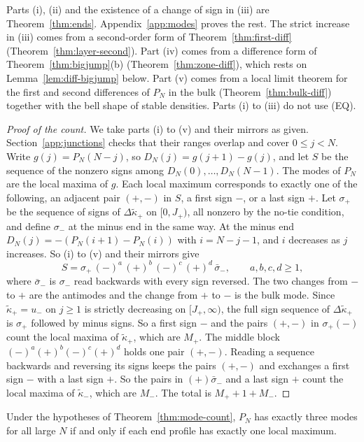 Parts (i), (ii) and the existence of a change of sign in (iii) are Theorem~\ref{thm:ends}.
Appendix~\ref{app:modes} proves the rest. The strict increase in (iii) comes from a second-order
form of Theorem~\ref{thm:first-diff} (Theorem~\ref{thm:layer-second}). Part (iv) comes from a
difference form of Theorem~\ref{thm:bigjump}(b) (Theorem~\ref{thm:zone-diff}), which rests on
Lemma~\ref{lem:diff-bigjump} below. Part (v) comes from a local limit theorem for the first and
second differences of $P_N$ in the bulk (Theorem~\ref{thm:bulk-diff}) together with the bell
shape of stable densities. Parts (i) to (iii) do not use (EQ).

\begin{proof}[Proof of the count]
We take parts (i) to (v) and their mirrors as given. Section~\ref{app:junctions} checks that
their ranges overlap and cover $0\le j<N$. Write $g(j)=P_N(N-j)$, so $D_N(j)=g(j+1)-g(j)$, and
let $S$ be the sequence of the nonzero signs among $D_N(0),\dots,D_N(N-1)$. The modes of $P_N$
are the local maxima of $g$. Each local maximum corresponds to exactly one of the following, an
adjacent pair $(+,-)$ in $S$, a first sign $-$, or a last sign $+$. Let $\sigma_\plus$ be the
sequence of signs of $\Delta\widetilde\kappa_\plus$ on $[0,J_\plus)$, all nonzero by the
no-tie condition, and define $\sigma_\minus$ at the minus end in the same way. At the minus end
$D_N(j)=-(P_N(i+1)-P_N(i))$ with $i=N-j-1$, and $i$ decreases as $j$ increases. So (i) to (v)
and their mirrors give
\[
 S=\sigma_\plus\,(-)^a\,(+)^b\,(-)^c\,(+)^d\,\bar\sigma_\minus,\qquad a,b,c,d\ge1,
\]
where $\bar\sigma_\minus$ is $\sigma_\minus$ read backwards with every sign reversed. The two
changes from $-$ to $+$ are the antimodes and the change from $+$ to $-$ is the bulk mode.
Since $\widetilde\kappa_\plus=u_\minus$ on $j\ge1$ is strictly decreasing on $[J_\plus,\infty)$,
the full sign sequence of $\Delta\widetilde\kappa_\plus$ is $\sigma_\plus$ followed by minus
signs. So a first sign $-$ and the pairs $(+,-)$ in $\sigma_\plus(-)$ count the local maxima
of $\widetilde\kappa_\plus$, which are $M_\plus$. The middle block $(-)^a(+)^b(-)^c(+)^d$ holds
one pair $(+,-)$. Reading a sequence backwards and reversing its signs keeps the pairs $(+,-)$
and exchanges a first sign $-$ with a last sign $+$. So the pairs in $(+)\bar\sigma_\minus$ and
a last sign $+$ count the local maxima of $\widetilde\kappa_\minus$, which are $M_\minus$. The
total is $M_\plus+1+M_\minus$.
\end{proof}

\begin{corollary}\label{cor:three-modes}
Under the hypotheses of Theorem~\ref{thm:mode-count}, $P_N$ has exactly three modes for all
large $N$ if and only if each end profile has exactly one local maximum.
\end{corollary}

